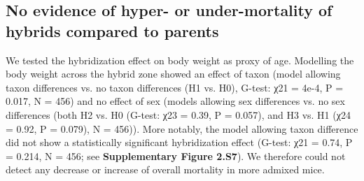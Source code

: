 \subsection{No evidence of hyper- or under-mortality of hybrids compared to parents}
We tested the hybridization effect on body weight as proxy of age. Modelling the body weight  across the hybrid zone showed an effect of taxon (model allowing taxon differences vs. no taxon differences (H1 vs. H0), G-test: χ21 = 4e-4, P = 0.017, N = 456) and no effect of sex (models allowing sex differences vs. no sex differences (both H2 vs. H0 (G-test: χ23 = 0.39, P = 0.057), and H3 vs. H1 (χ24 = 0.92, P = 0.079), N = 456)). More notably, the model allowing taxon difference did not show a statistically significant hybridization effect (G-test: χ21 = 0.74, P = 0.214, N = 456; see \textbf{Supplementary Figure 2.S7}). We therefore could not detect any decrease or increase of overall mortality in more admixed mice.

